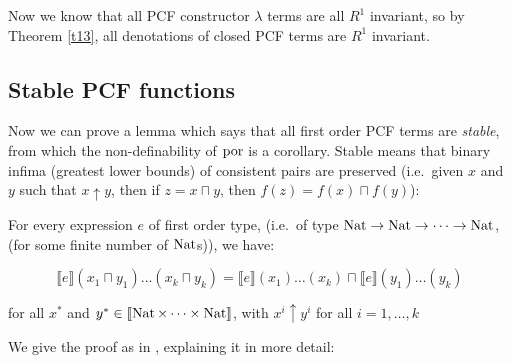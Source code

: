 Now we know that all PCF constructor $\lambda$ terms are all $R^1$ invariant, so by Theorem \ref{t13}, all denotations of closed PCF terms are $R^1$ invariant. 

\subsection{Stable PCF functions}

Now we can prove a lemma which says that all first order PCF terms are \emph{stable}, from which the non-definability of $\operatorname{por}$ is a corollary. Stable means that binary infima (greatest lower bounds) of consistent pairs are preserved (i.e.\ given $x$ and $y$ such that $x \uparrow y$, then if $z = x \sqcap y$, then $f(z) = f(x) \sqcap f(y)$):

\vspace{0.5cm}

\begin{lem}{\citep{Streicher06}}\label{stable}
For every expression $e$ of first order type, (i.e.\ of type $\operatorname{Nat} \to \operatorname{Nat} \to \dots \to \operatorname{Nat}$, (for some finite number of $\operatorname{Nat}$s)), we have:

\[ \llbracket e \rrbracket (x_1 \sqcap y_1) \dots (x_k \sqcap y_k)  =  \llbracket e \rrbracket(x_1) \dots (x_k) \sqcap \llbracket e \rrbracket(y_1) \dots (y_k)\]

for all $x^*$ and $y^* \in \llbracket \operatorname{Nat} \times \dots \times \operatorname{Nat} \rrbracket$, with $x^i \uparrow y^i$ for all $i = 1, \dots , k$ 
\end{lem}

We give the proof as in \citep{Streicher06}, explaining it in more detail:

